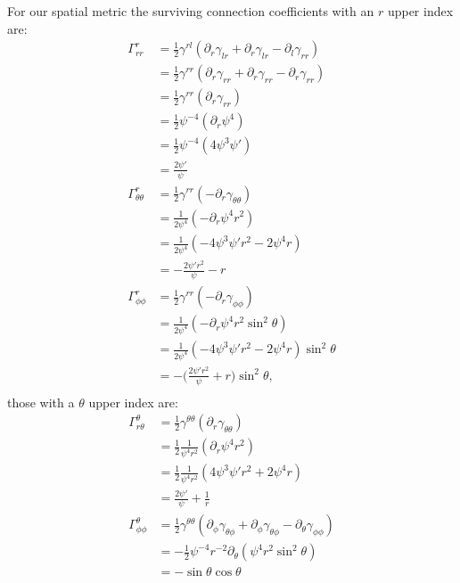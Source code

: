 \documentclass[12pt]{article}
\numberwithin{equation}{section}
\begin{document}
For our spatial metric the surviving connection coefficients with an $r$ upper index are:
\begin{equation}
\begin{aligned}
\Gamma^{r}_{rr} &= \frac{1}{2} \gamma^{rl} (\partial_r \gamma_{lr} + \partial_r \gamma_{lr} - \partial_l \gamma_{rr})\\
&= \frac{1}{2} \gamma^{rr} (\partial_r \gamma_{rr} + \partial_r \gamma_{rr} - \partial_r \gamma_{rr})\\
&= \frac{1}{2} \gamma^{rr} (\partial_r \gamma_{rr})\\
&= \frac{1}{2} \psi^{-4} (\partial_r \psi^4)\\
&= \frac{1}{2} \psi^{-4} (4 \psi^3 \psi')\\
&= \frac{2 \psi'}{\psi} \\
\Gamma^r_{\theta \theta} &= \frac{1}{2} \gamma^{r r} (- \partial_r \gamma_{\theta \theta}) \\
&= \frac{1}{2 \psi^4} (- \partial_r \psi^4 r^2 ) \\
&= \frac{1}{2 \psi^4} (- 4 \psi^3 \psi' r^2 - 2 \psi^4 r ) \\
&= - \frac{2 \psi' r^2}{\psi} - r \\
\Gamma^r_{\phi \phi} &= \frac{1}{2} \gamma^{r r} ( - \partial_r \gamma_{\phi \phi}) \\
&= \frac{1}{2 \psi^4} ( - \partial_r \psi^4 r^2 \sin^2 \theta) \\
&= \frac{1}{2 \psi^4} ( - 4 \psi^3 \psi' r^2 - 2 \psi^4 r ) \sin^2 \theta \\
&= - \Big( \frac{2 \psi' r^2}{\psi} + r \Big) \sin^2 \theta, \\
\end{aligned}
\end{equation}
those with a $\theta$ upper index are:
\begin{equation}
\begin{aligned}
\Gamma^{\theta}_{r \theta} &= \frac{1}{2} \gamma^{\theta \theta} (\partial_r \gamma_{\theta \theta}) \\
&= \frac{1}{2} \frac{1}{\psi^4 r^2} (\partial_r \psi^4 r^2) \\
&= \frac{1}{2} \frac{1}{\psi^4 r^2} (4 \psi^3 \psi' r^2 + 2 \psi^4 r) \\
&= \frac{2 \psi'}{\psi}  + \frac{1}{r} \\
\Gamma^\theta_{\phi \phi} &= \frac{1}{2} \gamma^{\theta \theta} (\partial_\phi \gamma_{\theta \phi} + \partial_\phi \gamma_{\theta \phi} - \partial_\theta \gamma_{\phi \phi}) \\
&= - \frac{1}{2} \psi^{-4} r^{-2} \partial_\theta (\psi^4 r^2 \sin^2 \theta) \\
&= - \sin \theta \cos \theta \\
\end{aligned}
\end{equation}
\end{document}
